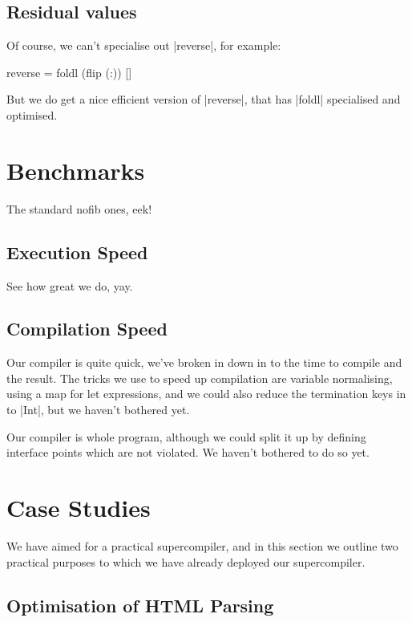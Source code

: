 \documentclass[draft]{sigplanconf}
\begin{document}
\begin{code}
\subsection{Residual values}

Of course, we can't specialise out |reverse|, for example:

\begin{code}
reverse = foldl (flip (:)) []
\end{code}

But we do get a nice efficient version of |reverse|, that has |foldl| specialised and optimised.

\section{Benchmarks}
\label{sec:benchmarks}

The standard nofib ones, eek!

\subsection{Execution Speed}

See how great we do, yay.

\subsection{Compilation Speed}

Our compiler is quite quick, we've broken in down in to the time to compile and the result. The tricks we use to speed up compilation are variable normalising, using a map for let expressions, and we could also reduce the termination keys in to |Int|, but we haven't bothered yet.

Our compiler is whole program, although we could split it up by defining interface points which are not violated. We haven't bothered to do so yet.

\section{Case Studies}

We have aimed for a practical supercompiler, and in this section we outline two practical purposes to which we have already deployed our supercompiler.

\subsection{Optimisation of HTML Parsing}
\label{sec:tagsoup}


\end{code}
\end{document}
